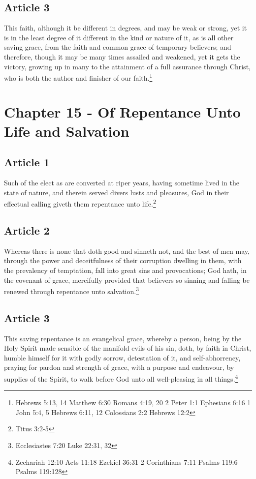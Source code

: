 \documentclass[12pt,letterpaper]{book}
\begin{document}
\section{Article 3}

This faith, although it be different in degrees, and may be weak or strong, yet it is in the least degree of it different in the kind or nature of it, as is all other saving grace, from the faith and common grace of temporary believers; and therefore, though it may be many times assailed and weakened, yet it gets the victory, growing up in many to the attainment of a full assurance through Christ, who is both the author and finisher of our faith.\footnote{Hebrews 5:13, 14 Matthew 6:30 Romans 4:19, 20 2 Peter 1:1 Ephesians 6:16 1 John 5:4, 5 Hebrews 6:11, 12 Colossians 2:2 Hebrews 12:2}

\chapter{Chapter 15 - Of Repentance Unto Life and Salvation}
\section{Article 1}

Such of the elect as are converted at riper years, having sometime lived in the state of nature, and therein served divers lusts and pleasures, God in their effectual calling giveth them repentance unto life.\footnote{Titus 3:2-5}

\section{Article 2}

Whereas there is none that doth good and sinneth not, and the best of men may, through the power and deceitfulness of their corruption dwelling in them, with the prevalency of temptation, fall into great sins and provocations; God hath, in the covenant of grace, mercifully provided that believers so sinning and falling be renewed through repentance unto salvation.\footnote{Ecclesiastes 7:20 Luke 22:31, 32}

\section{Article 3}

This saving repentance is an evangelical grace, whereby a person, being by the Holy Spirit made sensible of the manifold evils of his sin, doth, by faith in Christ, humble himself for it with godly sorrow, detestation of it, and self-abhorrency, praying for pardon and strength of grace, with a purpose and endeavour, by supplies of the Spirit, to walk before God unto all well-pleasing in all things.\footnote{Zechariah 12:10 Acts 11:18 Ezekiel 36:31 2 Corinthians 7:11 Psalms 119:6 Psalms 119:128}
\end{document}
